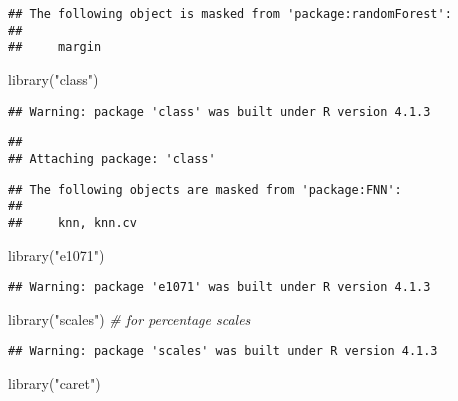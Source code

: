 \documentclass[
]{article}
\newenvironment{Shaded}{\begin{snugshade}}{\end{snugshade}}
\newcommand{\CommentTok}[1]{\textcolor[rgb]{0.56,0.35,0.01}{\textit{#1}}}
\newcommand{\FunctionTok}[1]{\textcolor[rgb]{0.00,0.00,0.00}{#1}}
\newcommand{\NormalTok}[1]{#1}
\newcommand{\StringTok}[1]{\textcolor[rgb]{0.31,0.60,0.02}{#1}}
\begin{document}
\begin{verbatim}
## The following object is masked from 'package:randomForest':
## 
##     margin
\end{verbatim}

\begin{Shaded}
\begin{Highlighting}[]
\FunctionTok{library}\NormalTok{(}\StringTok{"class"}\NormalTok{)}
\end{Highlighting}
\end{Shaded}

\begin{verbatim}
## Warning: package 'class' was built under R version 4.1.3
\end{verbatim}

\begin{verbatim}
## 
## Attaching package: 'class'
\end{verbatim}

\begin{verbatim}
## The following objects are masked from 'package:FNN':
## 
##     knn, knn.cv
\end{verbatim}

\begin{Shaded}
\begin{Highlighting}[]
\FunctionTok{library}\NormalTok{(}\StringTok{"e1071"}\NormalTok{)}
\end{Highlighting}
\end{Shaded}

\begin{verbatim}
## Warning: package 'e1071' was built under R version 4.1.3
\end{verbatim}

\begin{Shaded}
\begin{Highlighting}[]
\FunctionTok{library}\NormalTok{(}\StringTok{"scales"}\NormalTok{)  }\CommentTok{\# for percentage scales}
\end{Highlighting}
\end{Shaded}

\begin{verbatim}
## Warning: package 'scales' was built under R version 4.1.3
\end{verbatim}

\begin{Shaded}
\begin{Highlighting}[]
\FunctionTok{library}\NormalTok{(}\StringTok{"caret"}\NormalTok{)}
\end{Highlighting}
\end{Shaded}
\end{document}
